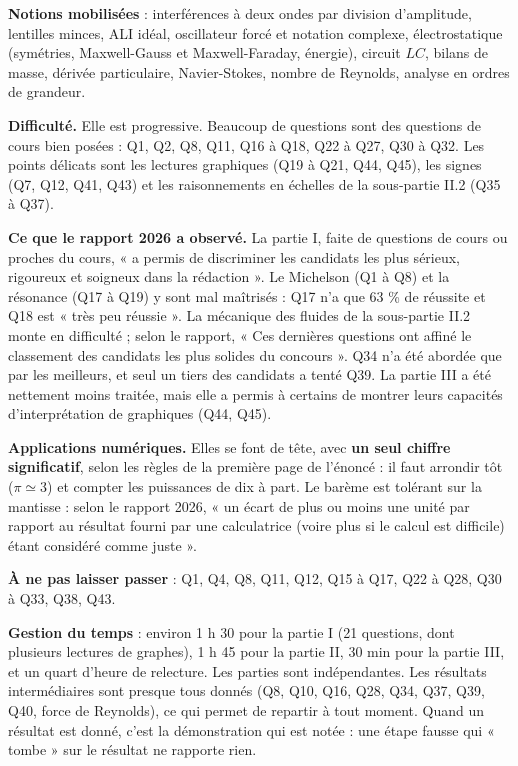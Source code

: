 \documentclass[11pt,a4paper]{article}
\begin{document}
\textbf{Notions mobilisées} : interférences à deux ondes par division d'amplitude, lentilles minces, ALI idéal, oscillateur forcé et notation complexe, électrostatique (symétries, Maxwell-Gauss et Maxwell-Faraday, énergie), circuit \(LC\), bilans de masse, dérivée particulaire, Navier-Stokes, nombre de Reynolds, analyse en ordres de grandeur.

\textbf{Difficulté.} Elle est progressive. Beaucoup de questions sont des questions de cours bien posées : Q1, Q2, Q8, Q11, Q16 à Q18, Q22 à Q27, Q30 à Q32. Les points délicats sont les lectures graphiques (Q19 à Q21, Q44, Q45), les signes (Q7, Q12, Q41, Q43) et les raisonnements en échelles de la sous-partie II.2 (Q35 à Q37).

\textbf{Ce que le rapport 2026 a observé.} La partie I, faite de questions de cours ou proches du cours, « a permis de discriminer les candidats les plus sérieux, rigoureux et soigneux dans la rédaction ». Le Michelson (Q1 à Q8) et la résonance (Q17 à Q19) y sont mal maîtrisés : Q17 n'a que 63 \% de réussite et Q18 est « très peu réussie ». La mécanique des fluides de la sous-partie II.2 monte en difficulté ; selon le rapport, « Ces dernières questions ont affiné le classement des candidats les plus solides du concours ». Q34 n'a été abordée que par les meilleurs, et seul un tiers des candidats a tenté Q39. La partie III a été nettement moins traitée, mais elle a permis à certains de montrer leurs capacités d'interprétation de graphiques (Q44, Q45).

\textbf{Applications numériques.} Elles se font de tête, avec \textbf{un seul chiffre significatif}, selon les règles de la première page de l'énoncé : il faut arrondir tôt (\(\pi\simeq3\)) et compter les puissances de dix à part. Le barème est tolérant sur la mantisse : selon le rapport 2026, « un écart de plus ou moins une unité par rapport au résultat fourni par une calculatrice (voire plus si le calcul est difficile) étant considéré comme juste ».

\textbf{À ne pas laisser passer} : Q1, Q4, Q8, Q11, Q12, Q15 à Q17, Q22 à Q28, Q30 à Q33, Q38, Q43.

\textbf{Gestion du temps} : environ 1 h 30 pour la partie I (21 questions, dont plusieurs lectures de graphes), 1 h 45 pour la partie II, 30 min pour la partie III, et un quart d'heure de relecture. Les parties sont indépendantes. Les résultats intermédiaires sont presque tous donnés (Q8, Q10, Q16, Q28, Q34, Q37, Q39, Q40, force de Reynolds), ce qui permet de repartir à tout moment. Quand un résultat est donné, c'est la démonstration qui est notée : une étape fausse qui « tombe » sur le résultat ne rapporte rien.
\end{document}
